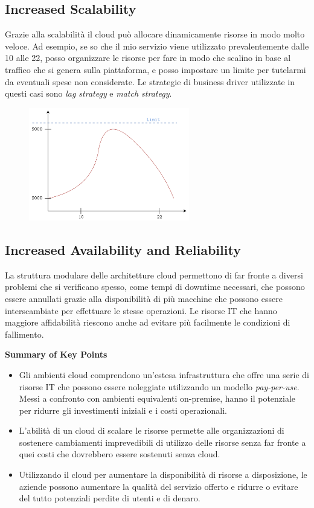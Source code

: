 \subsection{Increased Scalability}
Grazie alla scalabilità il cloud può allocare dinamicamente risorse in modo molto veloce. Ad esempio, se so che il mio servizio viene utilizzato prevalentemente dalle 10 alle 22, posso organizzare le risorse per fare in modo che scalino in base al traffico che si genera sulla piattaforma, e posso impostare un limite per tutelarmi da eventuali spese non considerate. Le strategie di business driver utilizzate in questi casi sono \textit{lag strategy} e \textit{match strategy}.
\begin{figure}[ht]
    \centering
    \includegraphics[width=7cm]{./Images/cap2/2.5.png}
    \label{fig:image2.5}
\end{figure}

\subsection{Increased Availability and Reliability}
La struttura modulare delle architetture cloud permettono di far fronte a diversi problemi che si verificano spesso, come tempi di downtime necessari, che possono essere annullati grazie alla disponibilità di più macchine che possono essere interscambiate per effettuare le stesse operazioni.
Le risorse IT che hanno maggiore affidabilità riescono anche ad evitare più facilmente le condizioni di fallimento.

\begin{mdframed}[backgroundcolor=gray!20,shadow=false]
\textbf{Summary of Key Points}
\begin{itemize}
    \item Gli ambienti cloud comprendono un'estesa infrastruttura che offre una serie di risorse IT che possono essere noleggiate utilizzando un modello \textit{pay-per-use}. Messi a confronto con ambienti equivalenti on-premise, hanno il potenziale per ridurre gli investimenti iniziali e i costi operazionali.
    \item L'abilità di un cloud di scalare le risorse permette alle organizzazioni di sostenere cambiamenti imprevedibili di utilizzo delle risorse senza far fronte a quei costi che dovrebbero essere sostenuti senza cloud.
    \item Utilizzando il cloud per aumentare la disponibilità di risorse a disposizione, le aziende possono aumentare la qualità del servizio offerto e ridurre o evitare del tutto potenziali perdite di utenti e di denaro.
\end{itemize}
\end{mdframed}

